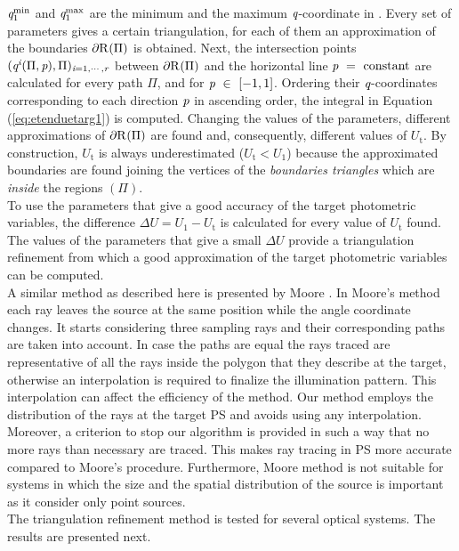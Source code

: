 $\textit{q}_1^{\textrm{min}}$ and $\textit{q}_1^{\textrm{max}}$ are the minimum and the maximum $\textit{q}$-coordinate in . Every set of parameters gives a certain triangulation, for each of them an approximation of the boundaries $\partial\mbox{$\textup{R}_{\textit{}}$}(\Pi)$ is obtained.
Next, the intersection points $(\textit{q}^{\textit{i}}( \Pi, \textit{p}), \Pi)_{\textit{i} = 1, \cdots, \textit{r}}$ between $\partial\mbox{$\textup{R}_{\textit{}}$}(\Pi)$
and the horizontal line $\textit{p}~=~ \textrm{constant}$ are calculated for every path $\Pi$, and for $\textit{p}~\in~[-1,1]$. Ordering their $\textit{q}$-coordinates corresponding to each direction $\textit{p}$ in ascending order, the integral in Equation (\ref{eq:etenduetarg1}) is computed.
Changing the values of the parameters, different approximations of $\partial\mbox{$\textup{R}_{\textit{}}$}(\Pi)$ are found and, consequently, different values of $U_{\textrm{t}}$. By construction, $U_{\textrm{t}}$ is always underestimated ($U_{\textrm{t}}<U_1$) because the approximated boundaries are found joining the vertices of the \textit{boundaries triangles} which are \textit{inside} the regions $(\Pi)$.
\\ \indent To use the parameters that give a good accuracy of the target photometric variables, the difference $\Delta U = U_1-U_{\textrm{t}}$ is calculated for every value of $U_{\textrm{t}}$ found. The values of the parameters that give a small $\Delta U$ provide a triangulation refinement from which a good approximation of the target photometric variables can be computed.
\\ \indent A similar method as described here is presented by Moore \cite{moore2013methods}. In Moore's method each ray leaves the source at the same position while the angle coordinate changes. It starts considering three sampling rays and their corresponding paths are taken into account. In case the paths are equal the rays traced are representative of all the rays inside the polygon that they describe at the target, otherwise an interpolation is required to finalize the illumination pattern. This interpolation can affect the efficiency of the method. Our method employs the distribution of the rays at the target PS and avoids using any interpolation. Moreover, a criterion to stop our algorithm is provided in such a way that no more rays than necessary are traced. This makes ray tracing in PS more accurate compared to Moore's procedure. Furthermore, Moore method is not suitable for systems in which the size and the spatial distribution of the source is important as it consider only point sources.\\ \indent
The triangulation refinement method is tested for several optical systems. The results are presented next.
